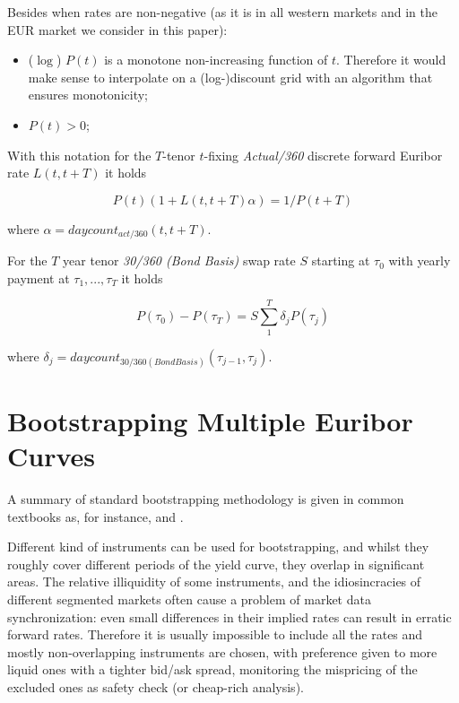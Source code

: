 \documentclass[11pt,reqno]{amsart}
\begin{document}
Besides when rates are non-negative (as it is in all western markets and in
the EUR market we consider in this paper):

\begin{itemize}
\item ($\log $) $P(t) $ is a monotone non-increasing function of
$t$. Therefore it would make sense to interpolate on a (log-)discount grid
with an algorithm that ensures monotonicity;

\item $P\left( t\right) >0$;
\end{itemize}

With this notation for the $T$-tenor $t$-fixing {\it Actual/360} discrete
forward Euribor rate $L(t, t+T)$ it holds

\begin{equation}
P(t) (1 + L(t, t+T) \alpha) = 1/P(t+T)
\label{eqn:Euriborrate}
\end{equation}

where $\alpha = daycount_{act/360}(t,t+T)$.

For the $T$ year tenor {\it 30/360 (Bond Basis)}
swap rate $S$ starting at $\tau_0$ with yearly payment at $\tau_1, ..., \tau_T$ it
holds

\begin{equation}
P(\tau_0)-P(\tau_T) = S \sum_1^T \delta_j P(\tau_j)
\label{eqn:swaprate}
\end{equation}

where $\delta_j = daycount_{30/360 (Bond Basis)}(\tau_{j-1}, \tau_j)$.

\section{Bootstrapping Multiple Euribor Curves}

A summary of standard bootstrapping methodology is given in common textbooks
as, for instance, \cite{Hull} and \cite{Rebonato}.

Different kind of instruments can be used for bootstrapping, and whilst they
roughly cover different periods of the yield curve, they overlap in
significant areas. The relative illiquidity of some instruments, and the
idiosincracies of different segmented markets often cause a problem of
market data synchronization: even small differences in their implied rates
can result in erratic forward rates. Therefore it is usually impossible to
include all the rates and mostly non-overlapping instruments are chosen,
with preference given to more liquid ones with a tighter bid/ask spread,
monitoring the mispricing of the excluded ones as safety check (or
cheap-rich analysis).
\end{document}
